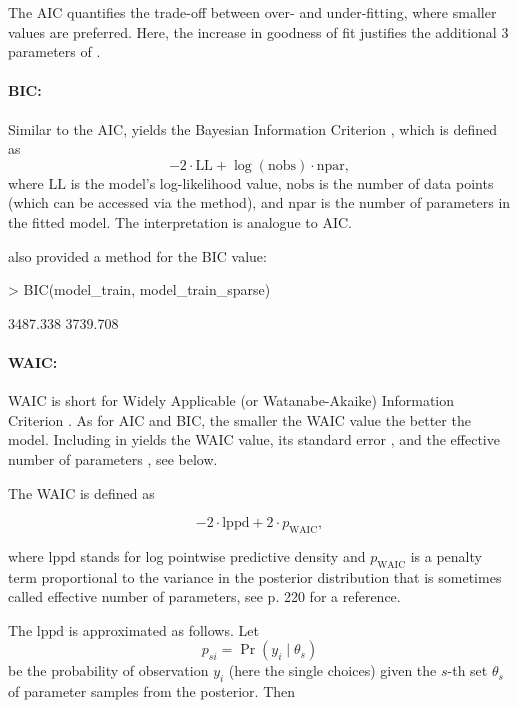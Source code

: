 \documentclass[article]{jss}
\newcommand{\fct}[1]{\code{#1()}}
\begin{document}
The AIC quantifies the trade-off between over- and under-fitting, where smaller values are preferred. Here, the increase in goodness of fit justifies the additional 3 parameters of .

\paragraph{BIC:}

Similar to the AIC,  yields the Bayesian Information Criterion \citep{Schwarz:1978}, which is defined as $$-2 \cdot \text{LL} + \log{(\text{nobs})} \cdot \text{npar},$$
where $\text{LL}$ is the model's log-likelihood value, $\text{nobs}$ is the number of data points (which can be accessed via the \fct{nobs} method), and $\text{npar}$ is the number of parameters in the fitted model. The interpretation is analogue to AIC.

 also provided a method for the BIC value:

\begin{Schunk}
\begin{Sinput}
> BIC(model_train, model_train_sparse)
\end{Sinput}
\begin{Soutput}
[1] 3487.338 3739.708
\end{Soutput}
\end{Schunk}

\paragraph{WAIC:}

WAIC is short for Widely Applicable (or Watanabe-Akaike) Information Criterion \citep{Watanabe:2010}. As for AIC and BIC, the smaller the WAIC value the better the model. Including  in  yields the WAIC value, its standard error , and the effective number of parameters , see below.

The WAIC is defined as

$$-2  \cdot \text{lppd} + 2\cdot p_\text{WAIC},$$

where $\text{lppd}$ stands for log pointwise predictive density and $p_\text{WAIC}$ is a penalty term proportional to the variance in the posterior distribution that is sometimes called effective number of parameters, see \cite{McElreath:2016} p. 220 for a reference.

The $\text{lppd}$ is approximated as follows. Let $$p_{si} = \Pr(y_i\mid \theta_s)$$ be the probability of observation $y_i$ (here the single choices) given the $s$-th set $\theta_s$ of parameter samples from the posterior. Then
\end{document}
